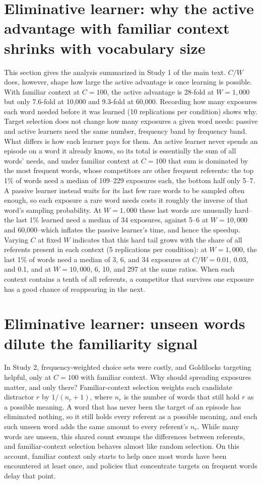 \documentclass[11pt]{article}
\begin{document}
\section{Eliminative learner: why the active advantage with familiar context shrinks with vocabulary size}
\label{sec-cw}
This section gives the analysis summarized in Study 1 of the main text. $C/W$ does, however, shape how large the active advantage is once learning is possible. With familiar context at $C=100$, the active advantage is 28-fold at $W=1{,}000$ but only 7.6-fold at 10,000 and 9.3-fold at 60,000. Recording how many exposures each word needed before it was learned (10 replications per condition) shows why. Target selection does not change how many exposures a given word needs: passive and active learners need the same number, frequency band by frequency band. What differs is how each learner pays for them. An active learner never spends an episode on a word it already knows, so its total is essentially the sum of all words' needs, and under familiar context at $C=100$ that sum is dominated by the most frequent words, whose competitors are other frequent referents: the top 1\% of words need a median of 109--229 exposures each, the bottom half only 5--7. A passive learner instead waits for its last few rare words to be sampled often enough, so each exposure a rare word needs costs it roughly the inverse of that word's sampling probability. At $W=1{,}000$ these last words are unusually hard--the last 1\% learned need a median of 34 exposures, against 5--6 at $W=10{,}000$ and 60,000--which inflates the passive learner's time, and hence the speedup. Varying $C$ at fixed $W$ indicates that this hard tail grows with the share of all referents present in each context (5 replications per condition): at $W=1{,}000$, the last 1\% of words need a median of 3, 6, and 34 exposures at $C/W=0.01$, 0.03, and 0.1, and at $W=10{,}000$, 6, 10, and 297 at the same ratios. When each context contains a tenth of all referents, a competitor that survives one exposure has a good chance of reappearing in the next.

\section{Eliminative learner: unseen words dilute the familiarity signal}
\label{sec-dilution}
In Study 2, frequency-weighted choice sets were costly, and Goldilocks targeting helpful, only at $C=100$ with familiar context. Why should spreading exposures matter, and only there? Familiar-context selection weights each candidate distractor $r$ by $1/(n_r+1)$, where $n_r$ is the number of words that still hold $r$ as a possible meaning. A word that has never been the target of an episode has eliminated nothing, so it still holds every referent as a possible meaning, and each such unseen word adds the same amount to every referent's $n_r$. While many words are unseen, this shared count swamps the differences between referents, and familiar-context selection behaves almost like random selection. On this account, familiar context only starts to help once most words have been encountered at least once, and policies that concentrate targets on frequent words delay that point.
\end{document}
